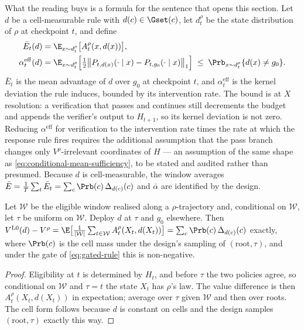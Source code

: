 What the reading buys is a formula for the sentence that opens this section.
Let $d$ be a cell-measurable rule with $d(c)\in\Gset(c)$, let $d^\rho_t$ be
the state distribution of $\rho$ at checkpoint $t$, and define
\begin{equation}
 \begin{aligned}
 \bar E_t(d)&=\E_{x\sim d^\rho_t}\big[A^\rho_t(x,d(x))\big],\\
 \alpha^{\mathrm{eff}}_t(d)&=\E_{x\sim d^\rho_t}
   \Big[\tfrac12\big\|P_{t,d(x)}(\cdot\mid x)-P_{t,g_0}(\cdot\mid x)\big\|_1\Big]
 \;\le\;\Prb_{x\sim d^\rho_t}\{d(x)\neq g_0\}.
 \end{aligned}
 \label{eq:transfer-terms}
\end{equation}
$\bar E_t$ is the mean advantage of $d$ over $g_0$ at checkpoint $t$, and
$\alpha^{\mathrm{eff}}_t$ is the kernel deviation the rule induces, bounded by
its intervention rate.  The bound is at $X$ resolution: a verification that
passes and continues still decrements the budget and appends the verifier's
output to $H_{t+1}$, so its kernel deviation is not zero.  Reducing
$\alpha^{\mathrm{eff}}$ for verification to the intervention rate times the
rate at which the response rule fires requires the additional assumption that
the pass branch changes only $V^\rho$-irrelevant coordinates of $H$ --- an
assumption of the same shape as \eqref{eq:conditional-mean-sufficiency}, to be
stated and audited rather than presumed.  Because $d$ is cell-measurable, the
window averages $\bar E=\frac1T\sum_t\bar E_t=\sum_c\Prb(c)\,\Delta_{d(c)}(c)$
and $\bar\alpha$ are identified by the design.

\begin{proposition}
\label{prop:l0}
Let $\mathcal W$ be the eligible window realised along a $\rho$-trajectory and,
conditional on $\mathcal W$, let $\tau$ be uniform on $\mathcal W$.  Deploy $d$
at $\tau$ and $g_0$ elsewhere.  Then
$V^{\mathrm{L0}}(d)-V^\rho=\E\big[\tfrac1{|\mathcal W|}\sum_{t\in\mathcal W}A^\rho_t(X_t,d(X_t))\big]
=\sum_c\Prb(c)\,\Delta_{d(c)}(c)$ exactly, where $\Prb(c)$ is the cell mass
under the design's sampling of $(\text{root},\tau)$, and under the gate of
\eqref{eq:gated-rule} this is non-negative.
\end{proposition}

\begin{proof}
Eligibility at $t$ is determined by $H_t$, and before $\tau$ the two policies
agree, so conditional on $\mathcal W$ and $\tau=t$ the state $X_t$ has $\rho$'s
law.  The value difference is then $A^\rho_t(X_t,d(X_t))$ in expectation; average
over $\tau$ given $\mathcal W$ and then over roots.  The cell form follows
because $d$ is constant on cells and the design samples $(\text{root},\tau)$
exactly this way.
\end{proof}


